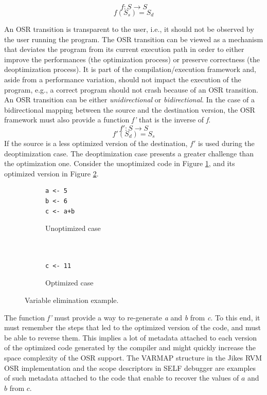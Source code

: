 \[f: S \rightarrow S\]
\[f(S_s) = S_d\]

An OSR transition is transparent to the user, i.e., it should not be observed by the user running the program.
The OSR transition can be viewed as a mechanism that deviates the program from its current execution path in order to either improve the performances (the optimization process) or preserve correctness (the deoptimization process).
It is part of the compilation/execution framework and, aside from a performance variation, should not impact the execution of the program, e.g., a correct program should not crash because of an OSR transition.\\

An OSR transition can be either \textit{unidirectional} or \textit{bidirectional}.
In the case of a bidirectional mapping between the source and the destination version, the OSR framework must also provide a function \textit{f'} that is the inverse of \textit{f}.  
\[f': S \rightarrow S\]
\[f'(S_d) = S_s\]
If the source is a less optimized version of the destination, $f'$ is used during the deoptimization case.
The deoptimization case presents a greater challenge than the optimization one.
Consider the unoptimized code in Figure \ref{unoptimizedcase}, and its optimized version in Figure \ref{optimizedcase}.

\begin{figure}[h]
\centering
\begin{subfigure}{.49\textwidth}
  \centering
  \begin{lstlisting}
a <- 5
b <- 6
c <- a+b
    \end{lstlisting}
  \caption{Unoptimized case}
  \label{unoptimizedcase}
\end{subfigure}%
\begin{subfigure}{.49\textwidth}
  \centering
  \begin{lstlisting}
  
  
c <- 11
    \end{lstlisting}
  \caption{Optimized case}
  \label{optimizedcase}
\end{subfigure}
\caption{Variable elimination example.}
\label{variableEliminationExample}
\end{figure}


The function \textit{f'} must provide a way to re-generate \textit{a} and \textit{b} from \textit{c}. 
To this end, it must remember the steps that led to the optimized version of the code, and must be able to reverse them.
This implies a lot of metadata attached to each version of the optimized code generated by the compiler and might quickly increase the space complexity of the OSR support.
The VARMAP structure in the Jikes RVM OSR implementation\cite{soman2006efficient} and the scope descriptors in SELF debugger\cite{holzle1992debugging} are examples of such metadata attached to the code that enable to recover the values of $a$ and $b$ from $c$.\\
 
